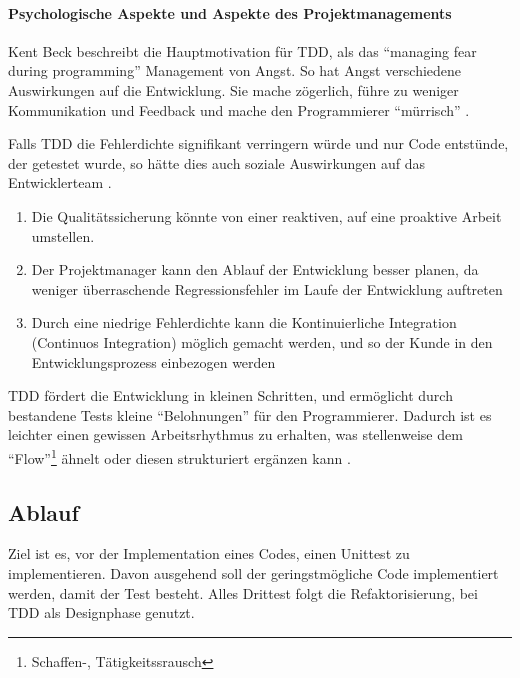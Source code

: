   \paragraph{Psychologische Aspekte und Aspekte des Projektmanagements}
  
  Kent Beck beschreibt die Hauptmotivation für TDD, als das "`managing fear during programming"' Management von Angst. So hat Angst verschiedene Auswirkungen auf die Entwicklung. Sie mache zögerlich, führe zu weniger Kommunikation und Feedback und mache den Programmierer "`mürrisch"' \citep[S. xi]{beck_test_2002}.
  
  
  Falls TDD die Fehlerdichte signifikant verringern würde und nur Code entstünde, der getestet wurde, so hätte dies auch soziale Auswirkungen auf das Entwicklerteam \citep[S. x]{beck_test_2002}. 
  \begin{enumerate}
   \item Die Qualitätssicherung könnte von einer reaktiven, auf eine proaktive Arbeit umstellen.
   \item Der Projektmanager kann den Ablauf der Entwicklung besser planen, da weniger überraschende Regressionsfehler im Laufe der Entwicklung auftreten
   \item Durch eine niedrige Fehlerdichte kann die Kontinuierliche Integration (Continuos Integration) möglich gemacht werden, und so der Kunde in den Entwicklungsprozess einbezogen werden
  \end{enumerate}
 
  TDD fördert die Entwicklung in kleinen Schritten, und ermöglicht durch bestandene Tests kleine "`Belohnungen"' für den Programmierer. Dadurch ist es leichter einen gewissen Arbeitsrhythmus zu erhalten, was stellenweise dem "`Flow"'\footnote{Schaffen-, Tätigkeitssrausch}  ähnelt oder diesen strukturiert ergänzen kann \citep{roger_brown_test_2008}.
  
\subsection{Ablauf}
  Ziel ist es, vor der Implementation eines Codes, einen Unittest zu implementieren. Davon ausgehend soll der geringstmögliche Code implementiert werden, damit der Test besteht. Alles Drittest folgt die Refaktorisierung, bei TDD als Designphase genutzt.
  
